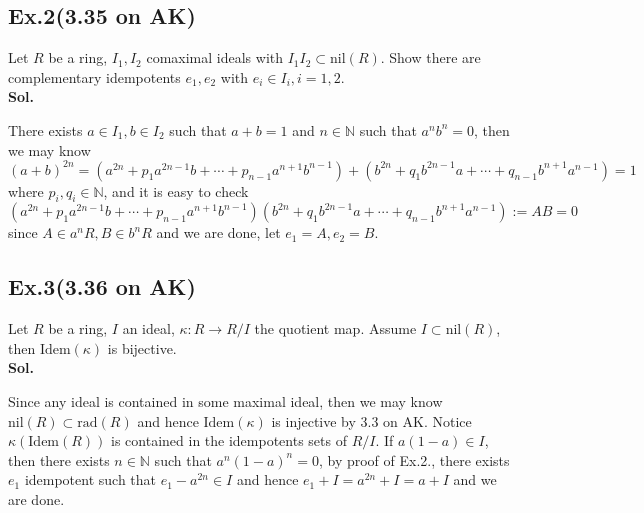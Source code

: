 \documentclass[lang=en,11pt,a4paper,citestyle =authoryear]{elegantpaper}
\begin{document}
\subsection*{Ex.2(3.35 on AK)} 
Let $R$ be a ring, $I_1,I_2$ comaximal ideals with $I_1I_2\subset \text{nil}(R)$. Show there are complementary idempotents $e_1,e_2$ with $e_i\in I_i, i = 1, 2$.
\vspace{0.5em}\\
\textbf{Sol.} \par
There exists $a\in I_1,b\in I_2$ such that $a+b = 1$ and $n\in \mathbb{N}$ such that $a^nb^n =0$, then we may know
\[
(a+b)^{2n} = (a^{2n}+p_1a^{2n-1}b+\cdots+p_{n-1}a^{n+1}b^{n-1})+(b^{2n}+q_1b^{2n-1}a+\cdots+q_{n-1}b^{n+1}a^{n-1}) = 1
\]
where $p_i,q_i\in\mathbb{N}$, and it is easy to check
\[
(a^{2n}+p_1a^{2n-1}b+\cdots+p_{n-1}a^{n+1}b^{n-1})(b^{2n}+q_1b^{2n-1}a+\cdots+q_{n-1}b^{n+1}a^{n-1}) := AB =0
\]
since $A \in a^nR,B\in b^nR$ and we are done, let $e_1 = A,e_2 = B$.
\par 
\vspace{0.5em}

\subsection*{Ex.3(3.36 on AK)} 
Let $R$ be a ring, $I$ an ideal, $\kappa:R\to R/I$ the quotient map. Assume $I\subset \text{nil}(R)$, then $\text{Idem}(\kappa)$ is bijective.
\vspace{0.5em}\\
\textbf{Sol.} \par
Since any ideal is contained in some maximal ideal, then we may know $\text{nil}(R) \subset \text{rad}(R)$ and hence $\text{Idem}(\kappa)$ is injective by 3.3 on AK. Notice $\kappa(\text{Idem}(R))$ is contained in the idempotents sets of $R/I$. If $a(1-a) \in I$, then there exists $n\in\mathbb{N}$ such that $a^n(1-a)^n = 0$, by proof of Ex.2., there exists $e_1$ idempotent such that $e_1 - a^{2n} \in I$ and hence $e_1+I = a^{2n}+I = a+I$ and we are done.
\par 
\vspace{0.5em}
\end{document}
